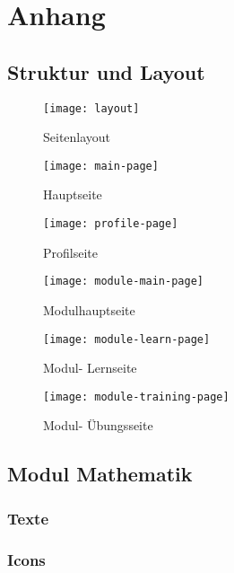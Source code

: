 \setcounter{section}{0}
\setcounter{subsection}{0}
\renewcommand*\thesection{\Alph{section}}

\chapter{Anhang}
\section{Struktur und Layout}


\begin{figure}[!ht]
  \centering
  \texttt{[image: layout]}\\
  \caption{Seitenlayout}
  \label{fig:layout}
\end{figure}

\begin{figure}[!ht]
  \centering
  \texttt{[image: main-page]}\\
  \caption{Hauptseite}
  \label{fig:main-page}
\end{figure}

\begin{figure}[!ht]
  \centering
  \texttt{[image: profile-page]}\\
  \caption{Profilseite}
  \label{fig:profile-page}
\end{figure}

\begin{figure}[!ht]
  \centering
  \texttt{[image: module-main-page]}\\
  \caption{Modulhauptseite}
  \label{fig:module-main-page}
\end{figure}

\begin{figure}[!ht]
  \centering
  \texttt{[image: module-learn-page]}\\
  \caption{Modul- Lernseite}
  \label{fig:module-learn-page}
\end{figure}

\begin{figure}[!ht]
  \centering
  \texttt{[image: module-training-page]}\\
  \caption{Modul- Übungsseite}
  \label{fig:module-training-page}
\end{figure}

\section{Modul Mathematik}
\subsection{Texte}
\subsection{Icons}
